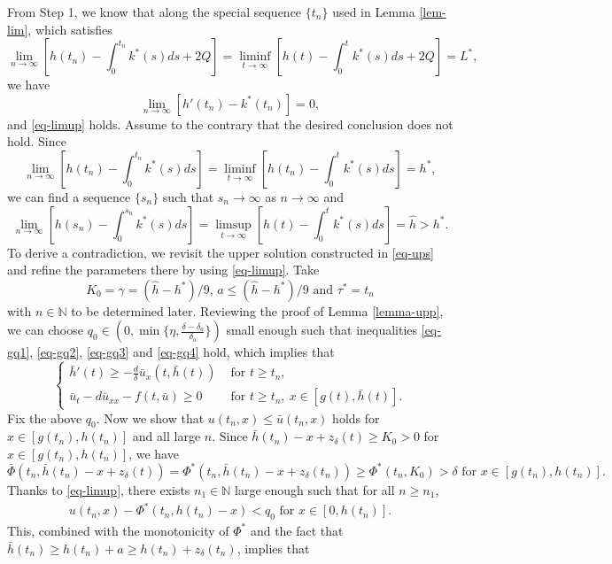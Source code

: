 \documentclass[11pt]{amsart}
\numberwithin{equation}{section}
\begin{document}
 From Step 1, we know that along the special sequence $\{t_n\}$ used  in Lemma \ref{lem-lim}, which  satisfies
 \[\lim_{n\to\infty}\left[h(t_n)-\int_0^{t_n}k^*(s)ds+2Q\right]=\liminf_{t\to\infty}\left[h(t)-\int_0^{t}k^*(s)ds+2Q\right]=L^*,\]
 we have   
\begin{equation}
  \lim_{n\to\infty}[h'(t_n)-k^*(t_n)]=0,
\end{equation}
and \eqref{eq-limup} holds.
Assume to the contrary that the desired  conclusion does not hold. 
Since 
\[\lim_{n\to\infty}\left[h(t_n)-\int_0^{t_n}k^*(s)ds\right]=\liminf_{t\to\infty}\left[h(t_n)-\int_0^{t}k^*(s)ds\right]=h^*,\]
 we can find a sequence $\{s_n\}$ such that $s_n\to \infty$ as $n\to\infty$ and 
\[\lim_{n\to\infty}\left[h(s_n)-\int_0^{s_n}k^*(s)ds\right]=\limsup_{t\to\infty}\left[h(t)-\int_0^{t}k^*(s)ds\right]=\hat{h}>h^*.\]
To derive a contradiction, we revisit the upper solution constructed in \eqref{eq-ups} and refine the parameters there by using \eqref{eq-limup}. 
Take 
\begin{equation}\label{parameters}
\mbox{$K_0=\gamma=(\hat{h}-h^*)/9$, $a\leq(\hat{h}-h^*)/9$ and $\tau^*=t_n$}
\end{equation}
 with $n\in\mathbb{N}$ to be determined later. Reviewing the proof of Lemma \ref{lemma-upp},  we can choose  $q_0\in(0,\min\{\eta,\frac{\delta-\delta_a}{\delta_a}\})$ small enough such that inequalities \eqref{eq-gq1}, \eqref{eq-gq2}, \eqref{eq-gq3} and \eqref{eq-gq4} hold, which implies that 
\begin{equation}\label{h-u}
\begin{cases}\bar{h}'(t)\geq -\frac{d}{\delta}\bar{u}_x(t,\bar{h}(t)) &\text{ for }t\geq t_n, \\
\bar{u}_t-d\bar{u}_{xx}-f(t,\bar{u})\geq 0 & \text{ for }t\geq t_n,\ x\in[g(t),\bar{h}(t)].
\end{cases}
 \end{equation}
Fix the above $q_0$. Now we show that $u(t_n,x)\leq \bar{u}(t_n,x)$ holds for  $x\in[g(t_n),h(t_n)]$ and all large $n$.
Since $\bar{h}(t_n)-x+z_\delta(t)\geq K_0>0$ for $x\in[g(t_n),h(t_n)]$, we have 
$$\bar{\Phi} (t_n,\bar{h}(t_n)-x+z_\delta(t))=\Phi^*(t_n,\bar{h}(t_n)-x+z_\delta(t_n))\geq \Phi^*(t_n,K_0)>\delta \text{ for }x\in[g(t_n),h(t_n)].$$
Thanks to \eqref{eq-limup},  there exists $n_1\in\mathbb{N}$ large enough such that for all $n\geq n_1$,
\begin{eqnarray*}
  u(t_n,x)- \Phi^*(t_n, h(t_n)-x)<q_0   \text{ for }x\in[0,h(t_n)].
\end{eqnarray*}
This, combined with the monotonicity of $\Phi^*$ and the fact that $\bar{h}(t_n)\geq h(t_n)+a\geq h(t_n)+z_\delta(t_n)$, implies that 
\end{document}
